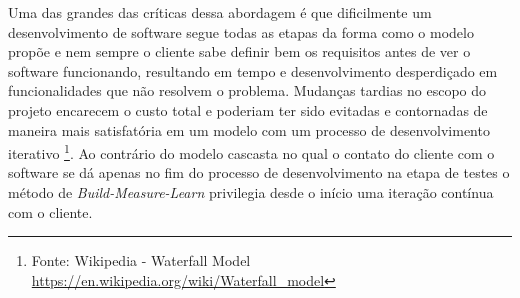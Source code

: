 \par Uma das grandes das críticas dessa abordagem é que dificilmente um desenvolvimento de software segue todas as etapas da forma como o modelo propõe e nem sempre o cliente sabe definir bem os requisitos antes de ver o software funcionando, resultando em tempo e desenvolvimento desperdiçado em funcionalidades que não resolvem o problema. Mudanças tardias no escopo do projeto encarecem o custo total e poderiam ter sido evitadas e contornadas de maneira mais satisfatória em um modelo com um processo de desenvolvimento iterativo \footnote{ Fonte: Wikipedia - Waterfall Model \url {https://en.wikipedia.org/wiki/Waterfall_model}}. Ao contrário do modelo cascasta no qual o contato do cliente com o software se dá apenas no fim do processo de desenvolvimento na etapa de testes o método de \emph{Build-Measure-Learn} privilegia desde o início uma iteração contínua com o cliente.

